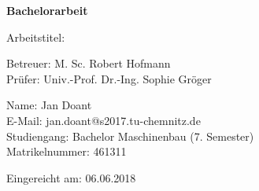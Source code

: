 \begin{titlepage}
		\begin{center}	
		
		\vspace{1.5cm}
		
		{\huge\textbf{Bachelorarbeit}}
		
		\vspace{1.5cm}
		
		{\large Arbeitstitel:}\\
		{\large\textbf{\mytitle}}
		
		\vspace{1.5cm}
		
		Betreuer: M. Sc. Robert Hofmann\\
		Prüfer: Univ.-Prof. Dr.-Ing. Sophie Gröger		
		
		\vfill
		
			
		
	\end{center}
	
	\begin{flushleft}
		Name: Jan Doant\\		
		E-Mail: jan.doant@s2017.tu-chemnitz.de\\
		Studiengang: Bachelor Maschinenbau (7. Semester)\\
		Matrikelnummer: 461311\linebreak
		
		
		Eingereicht am: 06.06.2018
		
	\end{flushleft}
	
	
\end{titlepage}